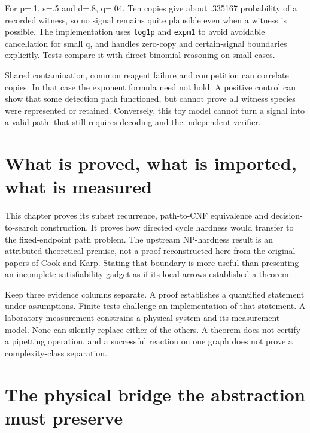 For p=.1, s=.5 and d=.8, q=.04. Ten copies give about .335167
probability of a recorded witness, so no signal remains quite plausible
even when a witness is possible. The implementation uses \texttt{log1p}
and \texttt{expm1} to avoid avoidable cancellation for small q, and
handles zero-copy and certain-signal boundaries explicitly. Tests
compare it with direct binomial reasoning on small cases.

Shared contamination, common reagent failure and competition can
correlate copies. In that case the exponent formula need not hold. A
positive control can show that some detection path functioned, but
cannot prove all witness species were represented or retained.
Conversely, this toy model cannot turn a signal into a valid path: that
still requires decoding and the independent verifier.

\section{What is proved, what is imported, what is
measured}\label{what-is-proved-what-is-imported-what-is-measured}


This chapter proves its subset recurrence, path-to-CNF equivalence and
decision-to-search construction. It proves how directed cycle hardness
would transfer to the fixed-endpoint path problem. The upstream
NP-hardness result is an attributed theoretical premise, not a proof
reconstructed here from the original papers of Cook and Karp.\cite{Cook1971,Karp1972} Stating that
boundary is more useful than presenting an incomplete satisfiability
gadget as if its local arrows established a theorem.

Keep three evidence columns separate. A proof establishes a quantified
statement under assumptions. Finite tests challenge an implementation of
that statement. A laboratory measurement constrains a physical system
and its measurement model. None can silently replace either of the
others. A theorem does not certify a pipetting operation, and a
successful reaction on one graph does not prove a complexity-class
separation.

\section{The physical bridge the abstraction must
preserve}\label{the-physical-bridge-the-abstraction-must-preserve}

